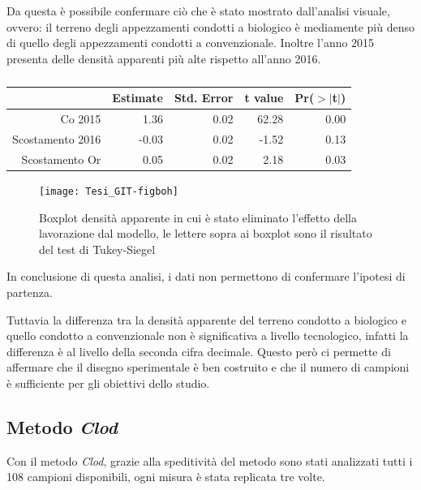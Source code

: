 \documentclass[11pt, a4paper, openright, titlepage, final, language = italian]{book}
\begin{document}
Da questa \`e possibile confermare ci\`o che \`e stato mostrato
dall'analisi visuale, ovvero: il terreno degli appezzamenti condotti a
biologico \`e mediamente pi\`u denso di quello degli appezzamenti
condotti a convenzionale. Inoltre l'anno 2015 presenta delle densit\`a
apparenti pi\`u alte rispetto all'anno 2016.



\begin{table}[ht]
\centering
\caption{} 
\label{tab:t-table del modello2}
\begin{tabular}{rrrrr}
  \hline
 & Estimate & Std. Error & t value & Pr($>$$|$t$|$) \\ 
  \hline
Co 2015 & 1.36 & 0.02 & 62.28 & 0.00 \\ 
  Scostamento 2016 & -0.03 & 0.02 & -1.52 & 0.13 \\ 
  Scostamento Or & 0.05 & 0.02 & 2.18 & 0.03 \\ 
   \hline
\end{tabular}
\end{table}


\begin{figure}[ht]
  \centering 
\texttt{[image: Tesi\_GIT-figboh]}
\caption{Boxplot densit\`a apparente in cui \`e stato eliminato
  l'effetto della lavorazione dal modello, le lettere sopra ai boxplot
  sono il risultato del test di Tukey-Siegel }
\end{figure}
\FloatBarrier

In conclusione di questa analisi, i dati non permettono di confermare
l'ipotesi di partenza.

Tuttavia la differenza tra la densit\`a apparente del terreno condotto
a biologico e quello condotto a convenzionale non \`e significativa a
livello tecnologico, infatti la differenza \`e al livello della
seconda cifra decimale. Questo per\`o ci permette di affermare che il
disegno sperimentale \`e ben costruito e che il numero di campioni \`e
sufficiente per gli obiettivi dello studio.

\subsection{Metodo \emph{Clod}}
Con il metodo \emph{Clod}, grazie alla speditivit\`a del metodo sono
stati analizzati tutti i 108 campioni disponibili, ogni misura \`e
stata replicata tre volte.
\end{document}

